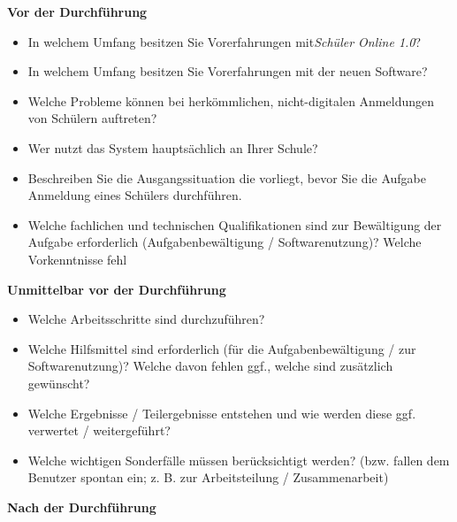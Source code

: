 \textbf{Vor der Durchführung}
\begin{itemize}
    \item In welchem Umfang besitzen Sie Vorerfahrungen mit\textit{Schüler Online 1.0}?
    \item In welchem Umfang besitzen Sie Vorerfahrungen mit der neuen Software?
    \item Welche Probleme können bei herkömmlichen, nicht-digitalen Anmeldungen von Schülern auftreten?
    \item Wer nutzt das System hauptsächlich an Ihrer Schule?
    \item Beschreiben Sie die Ausgangssituation die vorliegt, bevor Sie die Aufgabe \glqq Anmeldung eines Schülers\grqq{} durchführen.
    \item Welche fachlichen und technischen Qualifikationen sind zur Bewältigung der Aufgabe erforderlich (Aufgabenbewältigung / Softwarenutzung)? Welche Vorkenntnisse fehl
\end{itemize}
\textbf{Unmittelbar vor der Durchführung}
\begin{itemize}
    \item Welche Arbeitsschritte sind durchzuführen?
    \item Welche Hilfsmittel sind erforderlich (für die Aufgabenbewältigung / zur Softwarenutzung)? Welche davon fehlen ggf., welche sind zusätzlich gewünscht?
    \item Welche Ergebnisse / Teilergebnisse entstehen und wie werden diese ggf. verwertet / weitergeführt?
    \item Welche wichtigen Sonderfälle müssen berücksichtigt werden? (bzw. fallen dem Benutzer spontan ein; z. B. zur Arbeitsteilung / Zusammenarbeit)
\end{itemize}
\textbf{Nach der Durchführung}

